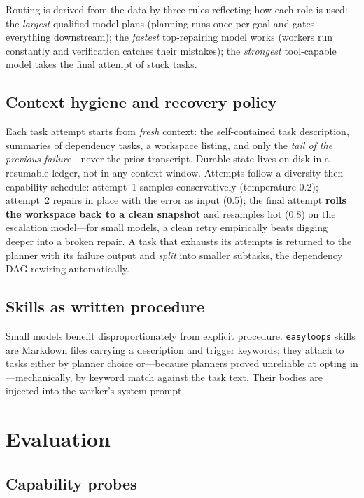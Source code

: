 \documentclass[11pt]{article}
\newcommand{\el}{\texttt{easyloops}}
\begin{document}
Routing is derived from the data by three rules reflecting how each role is used:
the \emph{largest} qualified model plans (planning runs once per goal and gates everything
downstream); the \emph{fastest} top-repairing model works (workers run constantly and
verification catches their mistakes); the \emph{strongest} tool-capable model takes the final
attempt of stuck tasks.

\subsection{Context hygiene and recovery policy}\label{sec:recovery}

Each task attempt starts from \emph{fresh} context: the self-contained task description,
summaries of dependency tasks, a workspace listing, and only the \emph{tail of the previous
failure}---never the prior transcript. Durable state lives on disk in a resumable ledger, not
in any context window. Attempts follow a diversity-then-capability schedule: attempt~1 samples
conservatively (temperature 0.2); attempt~2 repairs in place with the error as input (0.5);
the final attempt \textbf{rolls the workspace back to a clean snapshot} and resamples hot (0.8)
on the escalation model---for small models, a clean retry empirically beats digging deeper into
a broken repair. A task that exhausts its attempts is returned to the planner with its failure
output and \emph{split} into smaller subtasks, the dependency DAG rewiring automatically.

\subsection{Skills as written procedure}\label{sec:skills}

Small models benefit disproportionately from explicit procedure. \el{} skills are Markdown
files carrying a description and trigger keywords; they attach to tasks either by planner
choice or---because planners proved unreliable at opting in---mechanically, by keyword match
against the task text. Their bodies are injected into the worker's system prompt.

\section{Evaluation}

\subsection{Capability probes}
\end{document}
